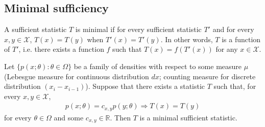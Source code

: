 \subsection{Minimal sufficiency}
\begin{definition}
    A sufficient statistic $T$ is minimal 
    if for every sufficient statistic $T'$ and 
    for every $x,y\in\mathcal{X}$, 
    $T(x)=T(y)$ when $T'(x)=T'(y)$.
    In other words, $T$ is a function of $T'$,
    i.e. there exists a function $f$ such that $T(x)=f(T'(x))$ for any $x\in\mathcal{X}$.
\end{definition}

\begin{theorem}
    Let $\{p(x;\theta):\theta\in\Omega\}$ be a family of densities with respect to some measure $\mu$
    (Lebesgue measure for continuous distribution $dx$; 
    counting measure for discrete distribution $(x_i-x_{i-1})$). 
    Suppose that there exists a statistic $T$ such that, 
    for every $x,y\in\mathcal{X}$,
    \begin{gather}
        p(x;\theta)=c_{x,y}p(y;\theta)\Rightarrow T(x)=T(y)
    \end{gather}
    for every $\theta\in\Omega$ and some $c_{x,y}\in\mathbb{R}$. 
    Then $T$ is a minimal sufficient statistic.
\end{theorem}
